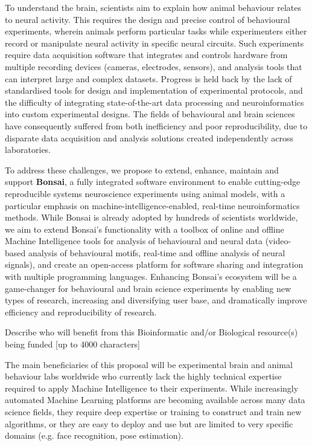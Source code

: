 To understand the brain, scientists aim to explain how animal behaviour relates to neural activity. This requires the design and precise control of behavioural experiments, wherein animals perform particular tasks while experimenters either record or manipulate neural activity in specific neural circuits. Such experiments require data acquisition software that integrates and controls hardware from multiple recording devices (cameras, electrodes, sensors), and analysis tools that can interpret large and complex datasets. Progress is held back by the lack of standardised tools for design and implementation of experimental protocols, and the difficulty of integrating state-of-the-art data processing and neuroinformatics into custom experimental designs. The fields of behavioural and brain sciences have consequently suffered from both inefficiency and poor reproducibility, due to disparate data acquisition and analysis solutions created independently across laboratories.   

To address these challenges, we propose to extend, enhance, maintain and support \textbf{Bonsai}, a fully integrated software environment to enable cutting-edge reproducible systems neuroscience experiments using animal models, with a particular emphasis on machine-intelligence-enabled, real-time neuroinformatics methods. While Bonsai is already adopted by hundreds of scientists worldwide, we aim to extend Bonsai’s functionality with a toolbox of online and offline Machine Intelligence tools for analysis of behavioural and neural data (video-based analysis of behavioural motifs, real-time and offline analysis of neural signals), and create an open-access platform for software sharing and integration with multiple programming languages. Enhancing Bonsai's ecosystem will be a game-changer for behavioural and brain science experiments by enabling new types of research, increasing and diversifying user base, and dramatically improve efficiency and reproducibility of research.


Describe who will benefit from this Bioinformatic and/or Biological resource(s) being funded [up to 4000 characters]

The main beneficiaries of this proposal will be experimental brain and animal behaviour labs worldwide who currently lack the highly technical expertise required to apply Machine Intelligence to their experiments. While increasingly automated Machine Learning platforms are becoming available across many data science fields, they require deep expertise or training to construct and train new algorithms, or they are easy to deploy and use but are limited to very specific domains (e.g. face recognition, pose estimation).




